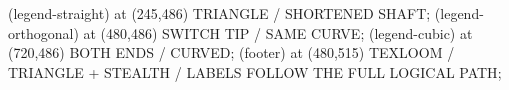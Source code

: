 \documentclass{article}
\begin{document}
\begin{loomscene}[width=960,height=540,duration=12,title={Arrowheads, without drift}]
\loomnode[caption,text=mint] (legend-straight) at (245,486) {TRIANGLE / SHORTENED SHAFT};
\loomnode[caption,text=gold] (legend-orthogonal) at (480,486) {SWITCH TIP / SAME CURVE};
\loomnode[caption,text=coral] (legend-cubic) at (720,486) {BOTH ENDS / CURVED};
\loomnode[small] (footer) at (480,515) {TEXLOOM / TRIANGLE + STEALTH / LABELS FOLLOW THE FULL LOGICAL PATH};
\end{loomscene}
\end{document}
